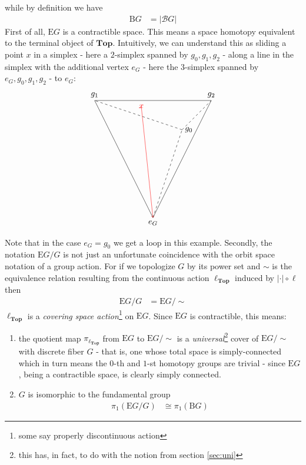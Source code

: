 while by definition we have
\begin{align*}
  \mathrm{B}G
  &=
  \vert
    \mathcal{B}G
  \vert
\end{align*}
First of all, $\mathrm{E}G$ is a contractible space.
This means a space homotopy equivalent to the terminal object of $\mathbf{Top}$.
Intuitively, we can understand this as sliding a point $x$ in a simplex - here a $2$-simplex spanned by $g_{0},g_{1},g_{2}$ - along a line in the simplex with the additional vertex $e_{G}$ - here the $3$-simplex spanned by $e_{G},g_{0},g_{1},g_{2}$ - to $e_{G}$:
\[
\begin{tikzpicture}[scale=1.25]
  \draw[dashed]
    (0,0) node[below] {$e_{G}$}
    --
    (1,3) node[right] {$g_{0}$};
  \draw
    (0,0)
    --
    (-2,4) node[above] {$g_{1}$};
  \draw
    (0,0)
    --
    (2,4) node[above] {$g_{2}$};
  \draw
    (-2,4)
    --
    (2,4);
  \draw[dashed]
    (1,3)
    --
    (-2,4);
  \draw[dashed]
    (1,3)
    --
    (2,4);
  \draw[->,red]
    (-0.4,3.8) node {$x$}
    --
    (0,0);
\end{tikzpicture}
\]
Note that in the case $e_{G} = g_{0}$ we get a loop in this example.
Secondly, the notation $\mathrm{E}G \slash G$ is not just an unfortunate coincidence with the orbit space notation of a group action.
For if we topologize $G$ by its power set and $\sim$ is the equivalence relation resulting from the continuous action $\ell_{\mathbf{Top}}$ induced by $\vert \cdot \vert \circ \ell$ then
\begin{align*}
  \mathrm{E}G
  \slash
  G
  &=
  \mathrm{E}G
  \slash
  \sim
\end{align*}
$\ell_{\mathbf{Top}}$ is a \textit{covering space action}\footnote{some say properly discontinuous action} on $\mathrm{E}G$.
Since $\mathrm{E}G$ is contractible, this means:
\begin{enumerate}
\item[$\bullet$]
the quotient map $\pi_{\ell_{\mathbf{Top}}}$ from $\mathrm{E}G$ to $\mathrm{E}G \slash \sim$ is a \textit{universal}\footnote{this has, in fact, to do with the notion from section \ref{sec:uni}} cover of $\mathrm{E}G \slash \sim$ with discrete fiber $G$ - that is, one whose total space is simply-connected which in turn means the $0$-th and $1$-st homotopy groups are trivial - since $\mathrm{E}G$, being a contractible space, is clearly simply connected.
\item[$\bullet$]
$G$ is isomorphic to the fundamental group
\begin{align*}
  \pi_{1}(\mathrm{E}G \slash G)
  &\cong
  \pi_{1}(\mathrm{B}G)
\end{align*}
\end{enumerate}
